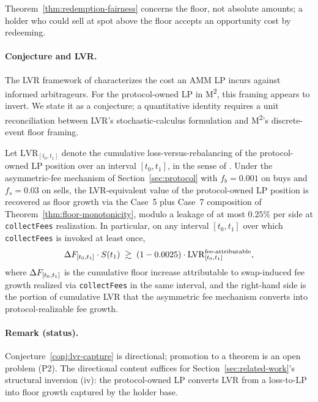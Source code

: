 Theorem~\ref{thm:redemption-fairness} concerns the floor, not absolute amounts; a holder who could sell at spot above the floor accepts an opportunity cost by redeeming.

\paragraph{Conjecture and LVR.} The LVR framework of \citet{MilionisMoallemiRoughgarden2023} characterizes the cost an AMM LP incurs against informed arbitrageurs. For the protocol-owned LP in M\textsuperscript{2}, this framing appears to invert. We state it as a conjecture; a quantitative identity requires a unit reconciliation between LVR's stochastic-calculus formulation and M\textsuperscript{2}'s discrete-event floor framing.

\begin{conjecture}
\label{conj:lvr-capture}
Let $\mathrm{LVR}_{[t_0, t_1]}$ denote the cumulative loss-versus-rebalancing of the protocol-owned LP position over an interval $[t_0, t_1]$, in the sense of \citet{MilionisMoallemiRoughgarden2023}. Under the asymmetric-fee mechanism of Section~\ref{sec:protocol} with $f_b = 0.001$ on buys and $f_s = 0.03$ on sells, the LVR-equivalent value of the protocol-owned LP position is recovered as floor growth via the Case~5 plus Case~7 composition of Theorem~\ref{thm:floor-monotonicity}, modulo a leakage of at most $0.25\%$ per side at \texttt{collectFees} realization. In particular, on any interval $[t_0, t_1]$ over which \texttt{collectFees} is invoked at least once,
\begin{equation}
\Delta F_{[t_0, t_1]} \cdot S(t_1) \;\gtrsim\; (1 - 0.0025) \cdot \mathrm{LVR}^{\text{fee-attributable}}_{[t_0, t_1]},
\label{eq:lvr-capture}
\end{equation}
where $\Delta F_{[t_0, t_1]}$ is the cumulative floor increase attributable to swap-induced fee growth realized via \texttt{collectFees} in the same interval, and the right-hand side is the portion of cumulative LVR that the asymmetric fee mechanism converts into protocol-realizable fee growth.
\end{conjecture}

\paragraph{Remark (status).} Conjecture~\ref{conj:lvr-capture} is directional; promotion to a theorem is an open problem (P2). The directional content suffices for Section~\ref{sec:related-work}'s structural inversion (iv): the protocol-owned LP converts LVR from a loss-to-LP into floor growth captured by the holder base.
